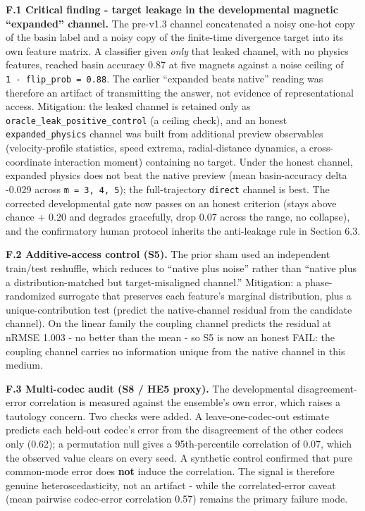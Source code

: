 \documentclass[
  11pt,
]{article}
\begin{document}
\textbf{F.1 Critical finding - target leakage in the
developmental magnetic ``expanded'' channel.} The
pre-v1.3 channel concatenated a noisy one-hot copy of
the basin label and a noisy copy of the finite-time
divergence target into its own feature matrix. A
classifier given \emph{only} that leaked channel, with
no physics features, reached basin accuracy 0.87 at
five magnets against a noise ceiling of
\texttt{1\ -\ flip\_prob\ =\ 0.88}. The earlier
``expanded beats native'' reading was therefore an
artifact of transmitting the answer, not evidence of
representational access. Mitigation: the leaked channel
is retained only as
\texttt{oracle\_leak\_positive\_control} (a ceiling
check), and an honest \texttt{expanded\_physics}
channel was built from additional preview observables
(velocity-profile statistics, speed extrema,
radial-distance dynamics, a cross-coordinate
interaction moment) containing no target. Under the
honest channel, expanded physics does not beat the
native preview (mean basin-accuracy delta -0.029 across
\texttt{m\ =\ 3,\ 4,\ 5}); the full-trajectory
\texttt{direct} channel is best. The corrected
developmental gate now passes on an honest criterion
(stays above chance + 0.20 and degrades gracefully,
drop 0.07 across the range, no collapse), and the
confirmatory human protocol inherits the anti-leakage
rule in Section 6.3.

\textbf{F.2 Additive-access control (S5).} The prior
sham used an independent train/test reshuffle, which
reduces to ``native plus noise'' rather than ``native
plus a distribution-matched but target-misaligned
channel.'' Mitigation: a phase-randomized surrogate
that preserves each feature's marginal distribution,
plus a unique-contribution test (predict the
native-channel residual from the candidate channel). On
the linear family the coupling channel predicts the
residual at nRMSE 1.003 - no better than the mean - so
S5 is now an honest FAIL: the coupling channel carries
no information unique from the native channel in this
medium.

\textbf{F.3 Multi-codec audit (S8 / HE5 proxy).} The
developmental disagreement-error correlation is
measured against the ensemble's own error, which raises
a tautology concern. Two checks were added. A
leave-one-codec-out estimate predicts each held-out
codec's error from the disagreement of the other codecs
only (0.62); a permutation null gives a 95th-percentile
correlation of 0.07, which the observed value clears on
every seed. A synthetic control confirmed that pure
common-mode error does \textbf{not} induce the
correlation. The signal is therefore genuine
heteroscedasticity, not an artifact - while the
correlated-error caveat (mean pairwise codec-error
correlation 0.57) remains the primary failure mode.
\end{document}
